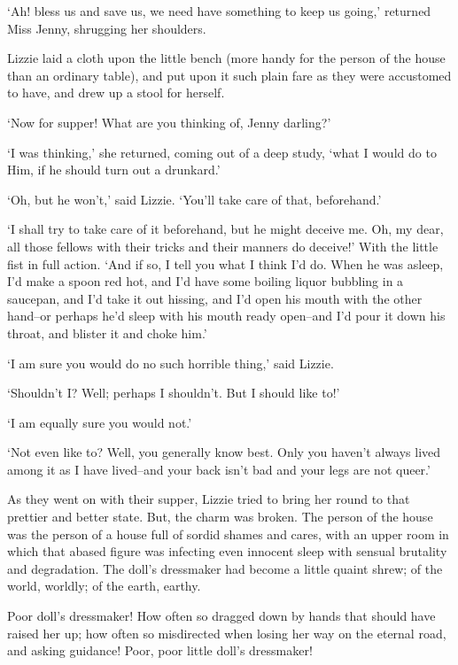‘Ah! bless us and save us, we need have something to keep us going,’
returned Miss Jenny, shrugging her shoulders.

Lizzie laid a cloth upon the little bench (more handy for the person of
the house than an ordinary table), and put upon it such plain fare as
they were accustomed to have, and drew up a stool for herself.

‘Now for supper! What are you thinking of, Jenny darling?’

‘I was thinking,’ she returned, coming out of a deep study, ‘what I
would do to Him, if he should turn out a drunkard.’

‘Oh, but he won’t,’ said Lizzie. ‘You’ll take care of that, beforehand.’

‘I shall try to take care of it beforehand, but he might deceive me.
Oh, my dear, all those fellows with their tricks and their manners do
deceive!’ With the little fist in full action. ‘And if so, I tell you
what I think I’d do. When he was asleep, I’d make a spoon red hot, and
I’d have some boiling liquor bubbling in a saucepan, and I’d take it
out hissing, and I’d open his mouth with the other hand--or perhaps he’d
sleep with his mouth ready open--and I’d pour it down his throat, and
blister it and choke him.’

‘I am sure you would do no such horrible thing,’ said Lizzie.

‘Shouldn’t I? Well; perhaps I shouldn’t. But I should like to!’

‘I am equally sure you would not.’

‘Not even like to? Well, you generally know best. Only you haven’t
always lived among it as I have lived--and your back isn’t bad and your
legs are not queer.’

As they went on with their supper, Lizzie tried to bring her round to
that prettier and better state. But, the charm was broken. The person
of the house was the person of a house full of sordid shames and cares,
with an upper room in which that abased figure was infecting even
innocent sleep with sensual brutality and degradation. The doll’s
dressmaker had become a little quaint shrew; of the world, worldly; of
the earth, earthy.

Poor doll’s dressmaker! How often so dragged down by hands that should
have raised her up; how often so misdirected when losing her way on the
eternal road, and asking guidance! Poor, poor little doll’s dressmaker!



